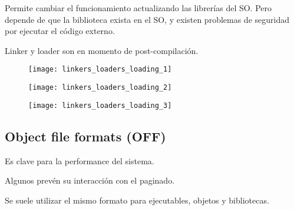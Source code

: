 \documentclass[a4paper, twoside]{article}
\begin{document}
Permite cambiar el funcionamiento actualizando las librerías del SO. Pero depende de que la biblioteca exista en el SO, y existen problemas de seguridad por ejecutar el código externo.

Linker y loader son en momento de post-compilación.

\begin{figure}[h]
	\centering
	\texttt{[image: linkers\_loaders\_loading\_1]}
	\label{fig:linkers_loaders_loading_1}
\end{figure}

\begin{figure}[h]
	\centering
	\texttt{[image: linkers\_loaders\_loading\_2]}
	\label{fig:linkers_loaders_loading_2}
\end{figure}

\begin{figure}[h]
	\centering
	\texttt{[image: linkers\_loaders\_loading\_3]}
	\label{fig:linkers_loaders_loading_3}
\end{figure}

\subsection{Object file formats (OFF)}
Es clave para la performance del sistema.

Algunos prevén su interacción con el paginado.

Se suele utilizar el mismo formato para ejecutables, objetos y bibliotecas.
\end{document}
